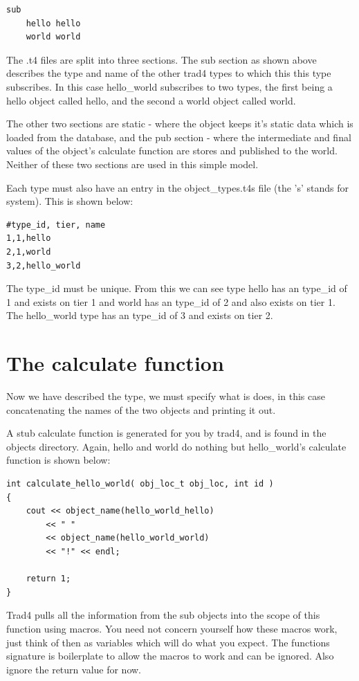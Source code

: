 \documentclass{report}
\begin{document}
\begin{verbatim}
sub
    hello hello
    world world
\end{verbatim}

The .t4 files are split into three sections. The sub section as shown above describes the type and name of the other trad4 types to which this this type subscribes. In this case hello_world subscribes to two types, the first being a hello object called hello, and the second a world object called world.

The other two sections are static - where the object keeps it's static data which is loaded from the database, and the pub section - where the intermediate and final values of the object's calculate function are stores and published to the world. Neither of these two sections are used in this simple model.

Each type must also have an entry in the object_types.t4s file (the 's' stands for system). This is shown below:

\begin{verbatim}
#type_id, tier, name
1,1,hello
2,1,world
3,2,hello_world
\end{verbatim}


The type_id must be unique. From this we can see type hello has an type_id of 1 and exists on tier 1 and world has an type_id of 2 and also exists on tier 1. The hello_world type has an type_id of 3 and exists on tier 2.

\section{The calculate function}

Now we have described the type, we must specify what is does, in this case concatenating the names of the two objects and printing it out.

A stub calculate function is generated for you by trad4, and is found in the objects directory. Again, hello and world do nothing but hello_world's calculate function is shown below:

\begin{verbatim}
int calculate_hello_world( obj_loc_t obj_loc, int id )
{
    cout << object_name(hello_world_hello) 
        << " " 
        << object_name(hello_world_world) 
        << "!" << endl;

    return 1;
}
\end{verbatim}

Trad4 pulls all the information from the sub objects into the scope of this function using macros. You need not concern yourself how these macros work, just think of then as variables which will do what you expect. The functions signature is boilerplate to allow the macros to work and can be ignored. Also ignore the return value for now.
\end{document}
